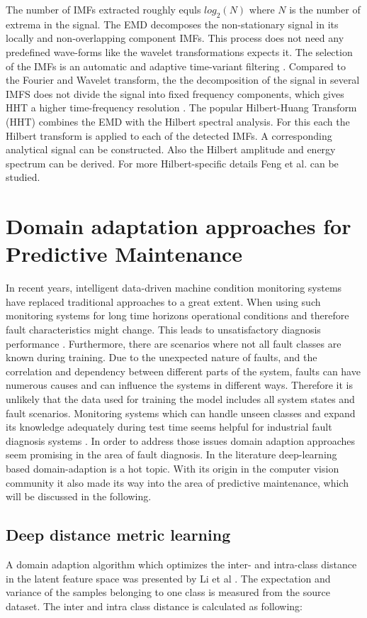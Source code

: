 The number of IMFs extracted roughly equls $log_{2}(N)$ where $N$ is the number of extrema in the signal. The EMD decomposes the non-stationary signal in its locally and non-overlapping component IMFs. This process does not need any predefined wave-forms like the wavelet transformations expects it. The selection of the IMFs is an automatic and adaptive time-variant filtering  \cite{Faltermeier2010}. Compared to the Fourier and Wavelet transform, the the decomposition of the signal in several IMFS does not divide the signal into fixed frequency components, which gives HHT a higher time-frequency resolution \cite{Verstraete2017}. The popular Hilbert-Huang Transform (HHT) combines the EMD with the Hilbert spectral analysis. For this each the Hilbert transform is applied to each of the detected IMFs. A corresponding analytical signal can be constructed. Also the Hilbert amplitude and energy spectrum can be derived. For more Hilbert-specific details Feng et al. \cite{FENG2013} can be studied.


\section{Domain adaptation approaches for Predictive Maintenance}
In recent years, intelligent data-driven machine condition monitoring systems have replaced traditional approaches to a great extent. When using such monitoring systems for long time horizons operational conditions and therefore fault characteristics might change. This leads to unsatisfactory diagnosis performance \cite{AZAMFAR2020103932}. Furthermore, there are scenarios where not all fault classes are known during training. Due to the unexpected nature of faults, and the correlation and dependency between different parts of the system, faults can have numerous causes and can influence the systems in different ways. Therefore it is unlikely that the data used for training the model includes all system states and fault scenarios. Monitoring systems which can handle unseen classes and expand its knowledge adequately during test time seems helpful for industrial fault diagnosis systems \cite{Michau2017}. In order to address those issues domain adaption approaches seem promising in the area of fault diagnosis. In the literature deep-learning based domain-adaption is a hot topic. With its origin in the computer vision community it also made its way into the area of predictive maintenance, which will be discussed in the following. 

\subsection{Deep distance metric learning}
A domain adaption algorithm which optimizes the inter- and intra-class distance in the latent feature space was presented by Li et al \cite{Li2018}. The expectation and variance of the samples belonging to one class is measured from the source dataset. The inter and intra class distance is calculated as following:

